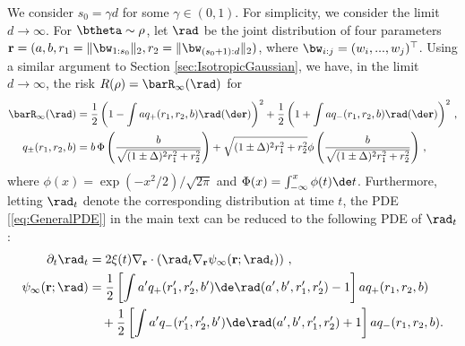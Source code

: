 \documentclass[11pt]{article}
\begin{document}
We consider $s_0=\gamma d$ for some $\gamma\in(0,1)$. For simplicity, we consider the limit $d\to\infty$. For $\btheta\sim\rho$, let $\rad$ be the joint distribution of four parameters $\mathbf{r} = (a,b,r_1=\Vert\bw_{1:s_0}\Vert_2,r_2=\Vert\bw_{(s_0+1):d}\Vert_2)$, where $\bw_{i:j}=(w_i,...,w_j)^\top$. Using a similar argument to Section \ref{sec:IsotropicGaussian}, we have, in the limit $d\to\infty$, the risk $R(\rho) = \barR_\infty(\rad)$ for
\begin{align}
\barR_{\infty}(\rad) &= \frac{1}{2}\left(1-\int aq_+(r_1,r_2,b) \rad(\de \mathbf{r})\right)^2+\frac{1}{2}\left(1+\int aq_-(r_1,r_2,b) \rad(\de \mathbf{r})\right)^2\, ,\\
q_\pm(r_1,r_2,b) &= b\, \Phi\left(\frac{b}{\sqrt{(1\pm\Delta)^2r_1^2+r_2^2}}\right) + \sqrt{(1\pm\Delta)^2r_1^2+r_2^2}\phi\left(\frac{b}{\sqrt{(1\pm\Delta)^2r_1^2+r_2^2}}\right)\, ,
\end{align}
where $\phi(x)=\exp(-x^2/2)/\sqrt{2\pi}$ and $\Phi(x)= \int_{-\infty}^x\phi(t)\de t$. Furthermore, letting $\rad_t$ denote the corresponding distribution at time $t$, the PDE [\ref{eq:GeneralPDE}] in the main text can be reduced to the following PDE of $\rad_t$:
\begin{align}
\partial_t\rad_t &= 2\xi(t)\nabla_\mathbf{r} \cdot \left( \rad_t\nabla_\mathbf{r}\psi_\infty(\mathbf{r};\rad_t) \right)\, ,\\
\psi_\infty(\mathbf{r}; \rad) &= \frac{1}{2} \left[ \int a'q_+(r_1',r_2',b') \de\rad(a',b',r_1',r_2') - 1 \right] aq_+(r_1,r_2,b) \nonumber\\
&\quad + \frac{1}{2} \left[ \int a'q_-(r_1',r_2',b') \de\rad(a',b',r_1',r_2') + 1 \right] aq_-(r_1,r_2,b).
\end{align}
\end{document}
